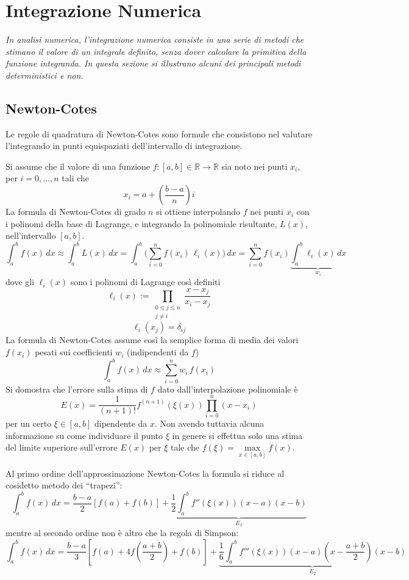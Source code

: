 \chapter{\huge Integrazione Numerica}

\textit{In analisi numerica, l'integrazione numerica consiste in una serie di metodi che stimano il valore di un integrale definito, senza dover calcolare la primitiva della funzione integranda. In questa sezione si illustrano alcuni dei principali metodi deterministici e non.}

\section{Newton-Cotes}
Le regole di quadratura di Newton-Cotes sono formule che consistono nel valutare l'integrando in punti equispaziati dell'intervallo di integrazione.

Si assume che il valore di una funzione $f:[a,b]\in\mathbb{R}\rightarrow\mathbb{R}$ sia noto nei punti $x_i$, per $i=0,...,n$ tali che $$x_i=a+\left(\frac{b-a}{n}\right)i$$
La formula di Newton-Cotes di grado $n$ si ottiene interpolando $f$ nei punti $x_i$ con i polinomi della base di Lagrange, e integrando la polinomiale risultante, $L(x)$, nell'intervallo $[a,b]$.
$$ \int_a^b f(x) \,dx \approx \int_a^b L(x)\,dx = \int_a^b \bigl( \sum_{i=0}^n f(x_i)\, \ell_i(x) \bigr) \, dx = \sum_{i=0}^n f(x_i) \underbrace{\int_a^b \ell_i(x)\, dx}_{w_i} $$
dove gli $\ell_i(x)$ sono i polinomi di Lagrange così definiti
$$\ell_i(x):= \prod_{\begin{smallmatrix}0\le j\le n\\ j\neq i\end{smallmatrix}} \frac{x-x_j}{x_i-x_j}$$$$\ell_i(x_j)=\delta_{ij}$$
La formula di Newton-Cotes assume così la semplice forma di media dei valori $f(x_i)$ pesati sui coefficienti $w_i$ (indipendenti da $f$)
$$\int_a^b f(x) \,dx \approx \sum_{i=0}^n w_i\, f(x_i)$$
Si domostra che l'errore sulla stima di $f$ dato dall'interpolazione polinomiale è
$$E(x)=\frac{1}{(n+1)!}f^{(n+1)}(\xi(x))\prod_{i=0}^n(x-x_i)$$
per un certo $\xi\in[a,b]$ dipendente da $x$. Non avendo tuttavia alcuna informazione su come individuare il punto $\xi$ in genere si effettua solo una stima del limite superiore sull'errore $E(x)$ per $\xi$ tale che $f(\xi) = \underset{x\in[a,b]}{\max}f(x)$.

Al primo ordine dell'approssimazione Newton-Cotes la formula si riduce al cosidetto metodo dei ``trapezi'':
$$\int_a^b f(x) \,dx=\frac{b-a}{2}\left[ f(a)+f(b)\right] + \underbrace{\frac{1}{2}\int_a^b f''(\xi(x))(x-a)(x-b)}_{E_1}$$
mentre al secondo ordine non è altro che la regola di Simpson:
$$\int_a^b f(x) \,dx=\frac{b-a}{3}\left[f(a)+4f(\frac{a+b}{2})+f(b)\right] + \underbrace{\frac{1}{6}\int_a^b f'''(\xi(x))(x-a)(x-\frac{a+b}{2})(x-b)}_{E_2}$$

